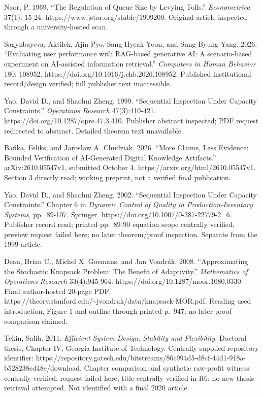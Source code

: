 \documentclass[
  11pt,
  a4paper,
]{article}
\begin{document}
Naor, P. 1969. ``The Regulation of Queue Size by Levying Tolls.''
\emph{Econometrica} 37(1): 15-24. https://www.jstor.org/stable/1909200.
Original article inspected through a university-hosted scan.

Sagynbayeva, Aktilek, Ajin Pyo, Sang-Hyeak Yoon, and Sung-Byung Yang.
2026. ``Evaluating user performance with RAG-based generative AI: A
scenario-based experiment on AI-assisted information retrieval.''
\emph{Computers in Human Behavior} 180: 108952.
https://doi.org/10.1016/j.chb.2026.108952. Published institutional
record/design verified; full publisher text inaccessible.

Yao, David D., and Shaohui Zheng. 1999. ``Sequential Inspection Under
Capacity Constraints.'' \emph{Operations Research} 47(3):410-421.
https://doi.org/10.1287/opre.47.3.410. Publisher abstract inspected; PDF
request redirected to abstract. Detailed theorem text unavailable.

Bańka, Feliks, and Jarosław A. Chudziak. 2026. ``More Claims, Less
Evidence: Bounded Verification of AI-Generated Digital Knowledge
Artifacts.'' arXiv:2610.05547v1, submitted October 4.
https://arxiv.org/html/2610.05547v1. Section 3 directly read; working
preprint, not a verified final publication.

Yao, David D., and Shaohui Zheng. 2002. ``Sequential Inspection Under
Capacity Constraints.'' Chapter 6 in \emph{Dynamic Control of Quality in
Production-Inventory Systems}, pp.~89-107. Springer.
https://doi.org/10.1007/0-387-22779-2\_6. Publisher record read; printed
pp.~89-90 equation scope centrally verified, preview request failed
here; no later theorem/proof inspection. Separate from the 1999 article.

Dean, Brian C., Michel X. Goemans, and Jan Vondrák. 2008.
``Approximating the Stochastic Knapsack Problem: The Benefit of
Adaptivity.'' \emph{Mathematics of Operations Research} 33(4):945-964.
https://doi.org/10.1287/moor.1080.0330. Final author-hosted 20-page PDF:
https://theory.stanford.edu/\textasciitilde jvondrak/data/knapsack-MOR.pdf.
Reading used introduction, Figure 1 and outline through printed p.~947;
no later-proof comparison claimed.

Tekin, Salih. 2011. \emph{Efficient System Design: Stability and
Flexibility}. Doctoral thesis, Chapter IV, Georgia Institute of
Technology. Centrally supplied repository identifier:
https://repository.gatech.edu/bitstreams/86c994d5-d8cf-44d1-918a-b528238ed48e/download.
Chapter comparison and synthetic raw-profit witness centrally verified;
request failed here, title centrally verified in R6; no new thesis
retrieval attempted. Not identified with a final 2020 article.
\end{document}
